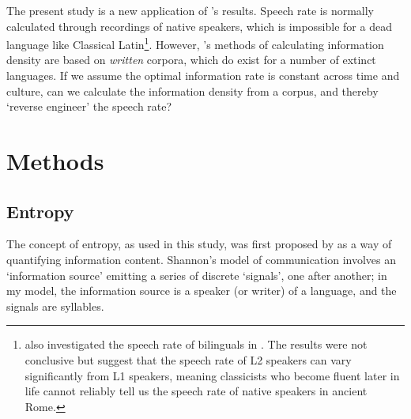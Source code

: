 \documentclass[12pt,twoside,leqno]{article} %
\begin{document}
The present study is a new application of \citeauthor{coupé}'s results. Speech rate is normally calculated through recordings of native speakers, which is impossible for a dead language like Classical Latin\footnote{\citeauthor{oh} also investigated the speech rate of bilinguals in \citet{ohbilingual}. The results were not conclusive but suggest that the speech rate of L2 speakers can vary significantly from L1 speakers, meaning classicists who become fluent later in life cannot reliably tell us the speech rate of native speakers in ancient Rome.}. However, \citeauthor{oh}'s methods of calculating information density are based on \emph{written} corpora, which do exist for a number of extinct languages. If we assume the optimal information rate is constant across time and culture, can we calculate the information density from a corpus, and thereby `reverse engineer' the speech rate? %




\section{Methods}
\label{sec:meth}

\subsection{Entropy}
\label{subsec:entropy}

The concept of entropy, as used in this study, was first proposed by \citet{shannon} as a way of quantifying information content. Shannon's model of communication involves an `information source' emitting a series of discrete `signals', one after another; in my model, the information source is a speaker (or writer) of a language, and the signals are syllables.
\end{document}
